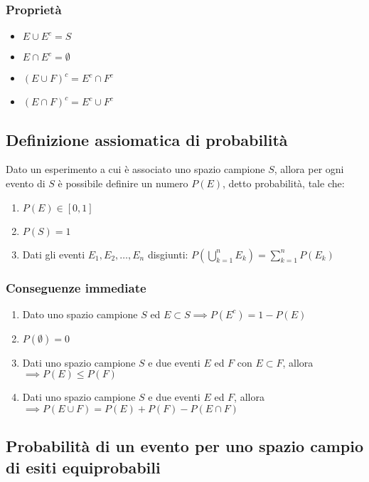 \documentclass{article}
\begin{document}
\subsubsection{Proprietà}

\begin{itemize}
    \item $E \cup E^c = S$
    \item $E \cap E^c = \emptyset$
    \item $(E \cup F)^c = E^c \cap F^c$
    \item $(E \cap F)^c = E^c \cup F^c$
\end{itemize}

\subsection{Definizione assiomatica di probabilità}

Dato un esperimento a cui è associato uno spazio campione $S$, allora per ogni evento di $S$ è possibile definire un numero $P(E)$, detto probabilità, tale che:

\begin{enumerate}
    \item $P(E) \in [0,1]$
    \item $P(S) = 1$
    \item Dati gli eventi $E_1, E_2, \dots, E_n$ disgiunti: $P(\bigcup^n_{k=1} E_k) = \sum^n_{k=1} P(E_k)$
\end{enumerate}

\subsubsection{Conseguenze immediate}

\begin{enumerate}
    \item Dato uno spazio campione $S$ ed $E \subset S \implies P(E^c) = 1 - P(E)$
    \item $P(\emptyset) = 0$
    \item Dati uno spazio campione $S$ e due eventi $E$ ed $F$ con $E \subset F$, allora $\implies P(E) \leq P(F)$
    \item Dati uno spazio campione $S$ e due eventi $E$ ed $F$, allora $\implies P(E \cup F) = P(E) + P(F) - P(E \cap F)$
\end{enumerate}

\subsection{Probabilità di un evento per uno spazio campio di esiti equiprobabili}
\end{document}
